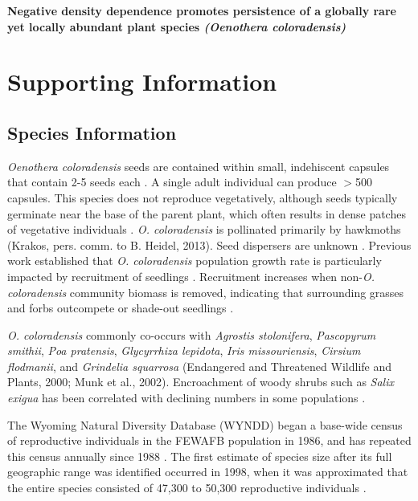 \documentclass[12pt, letterpaper]{article}
\begin{document}
\begin{flushleft}
\large\textbf{Negative density dependence promotes persistence of a globally rare yet locally abundant plant species \textit{(Oenothera coloradensis)}}

\end{flushleft}

\section*{Supporting Information}
\normalfont
\subsection{Species Information}
\textit{Oenothera coloradensis} seeds are contained within small, indehiscent capsules that contain 2-5 seeds each \cite{Burgess2005CapsuleColoradensis}. A single adult individual can produce $>$500 capsules. This species does not reproduce vegetatively, although seeds typically germinate near the base of the parent plant, which often results in dense patches of vegetative individuals \cite{Heidel202133-YearWyoming}. \textit{O. coloradensis} is pollinated primarily by hawkmoths (Krakos, pers. comm. to B. Heidel, 2013). Seed dispersers are unknown \cite{Floyd1998, Heidel202133-YearWyoming}. Previous work established that \textit{O. coloradensis} population growth rate is particularly impacted by recruitment of seedlings \cite{Floyd1998}. Recruitment increases when non-\textit{O. coloradensis} community biomass is removed, indicating that surrounding grasses and forbs outcompete or shade-out seedlings \cite{Munk2002RosetteSpecies}.
\nocite{krakosPersonalComm}

\textit{O. coloradensis} commonly co-occurs with \textit{Agrostis stolonifera}, \textit{Pascopyrum smithii}, \textit{Poa pratensis}, \textit{Glycyrrhiza lepidota}, \textit{Iris missouriensis}, \textit{Cirsium flodmanii}, and \textit{Grindelia squarrosa} (Endangered and Threatened Wildlife and Plants, 2000; Munk et al., 2002). Encroachment of woody shrubs such as \textit{Salix exigua} has been correlated with declining numbers in some populations \cite{Heidel202133-YearWyoming}.
\nocite{USFWS2019}

The Wyoming Natural Diversity Database (WYNDD) began a base-wide census of reproductive individuals in the FEWAFB population in 1986, and has repeated this census annually since 1988 \cite{Heidel202133-YearWyoming}. The first estimate of species size after its full geographic range was identified occurred in 1998, when it was approximated that the entire species consisted of 47,300 to 50,300 reproductive individuals \cite{Fertig2000-ow}.
\end{document}
